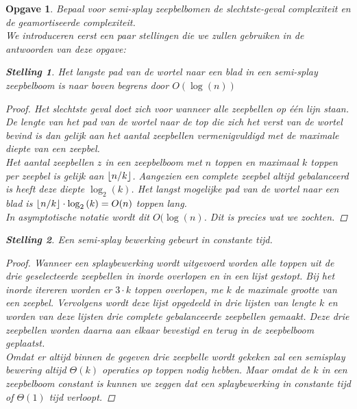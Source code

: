 \documentclass[12pt,hidelinks]{article}
\DeclarePairedDelimiter\floor{\lfloor}{\rfloor}
\newtheorem{opgave}{Opgave}
\newtheorem{stelling}{Stelling}
\newcommand{\newln}{~\\\vspace{0.5em}}
\begin{document}
    \begin{opgave}
        Bepaal voor semi-splay zeepbelbomen de slechtste-geval complexiteit en de geamortiseerde complexiteit.
        \newln \normalfont 
        We introduceren eerst een paar stellingen die we zullen gebruiken in de antwoorden van deze opgave:
        \begin{stelling}Het langste pad van de wortel naar een blad in een semi-splay zeepbelboom is naar boven begrens door $O(\log(n))$ \label{stelling1}
            \begin{proof}Het slechtste geval doet zich voor wanneer alle zeepbellen op één lijn staan.
                De lengte van het pad van de wortel naar de top die zich het verst van de wortel bevind is dan gelijk aan het aantal zeepbellen vermenigvuldigd met de maximale diepte van een zeepbel.
                \\
                Het aantal zeepbellen $z$ in een zeepbelboom met $n$ toppen en maximaal $k$ toppen per zeepbel is gelijk aan $\floor{n/k}$.
                Aangezien een complete zeepbel altijd gebalanceerd is heeft deze diepte $\log_2{(k)}$. 
                Het langst mogelijke pad van de wortel naar een blad is $\floor{n/k}\cdot\log_2{(k)} = O(n)$ toppen lang.
                \\
                In asymptotische notatie wordt dit $O(\log(n)$. Dit is precies wat we zochten.
            \end{proof}
        \end{stelling}
        \begin{stelling} Een semi-splay bewerking gebeurt in constante tijd. \label{stelling2}
            \begin{proof}
                Wanneer een splaybewerking wordt uitgevoerd worden alle toppen uit de drie geselecteerde zeepbellen in inorde overlopen en in een lijst gestopt.
                Bij het inorde itereren worden er $3\cdot k$ toppen overlopen, me $k$ de maximale grootte van een zeepbel.
                Vervolgens wordt deze lijst opgedeeld in drie lijsten van lengte $k$ en worden van deze lijsten drie complete gebalanceerde zeepbellen gemaakt.
                Deze drie zeepbellen worden daarna aan elkaar bevestigd en terug in de zeepbelboom geplaatst.
                \\
                Omdat er altijd binnen de gegeven drie zeepbelle wordt gekeken zal een semisplay bewering altijd $\Theta(k)$ operaties op toppen nodig hebben.
                Maar omdat de $k$ in een zeepbelboom constant is kunnen we zeggen dat een splaybewerking in constante tijd of $\Theta(1)$ tijd verloopt.

\end{proof}
\end{stelling}
\end{opgave}
\end{document}
